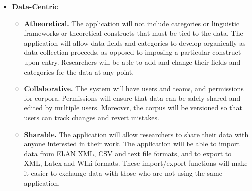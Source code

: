 \documentclass[12pt]{article}
\begin{document}
\begin{itemize}
\item{\bf Data-Centric}
\begin{itemize}
\item {\bf Atheoretical.} The application will not include categories or linguistic frameworks or theoretical constructs that must be tied to the data.  The application will allow data fields and categories to develop organically as data collection proceeds, as opposed to imposing a particular construct upon entry.  Researchers will be able to add and change their fields and categories for the data at any point.
\item {\bf Collaborative.} The system will have users and teams, and permissions for corpora. Permissions will ensure that data can be safely shared and edited by multiple users. Moreover, the corpus will be versioned so that users can track changes and revert mistakes.
\item {\bf Sharable.} The application will allow researchers to share their data with anyone interested in their work. The application will be able to import data from ELAN XML, CSV and text file formats, and to export to XML, Latex and WIki formats. These import/export functions will make it easier to exchange data with those who are not using the same application. 
\end{itemize}



\end{itemize}
\end{document}
